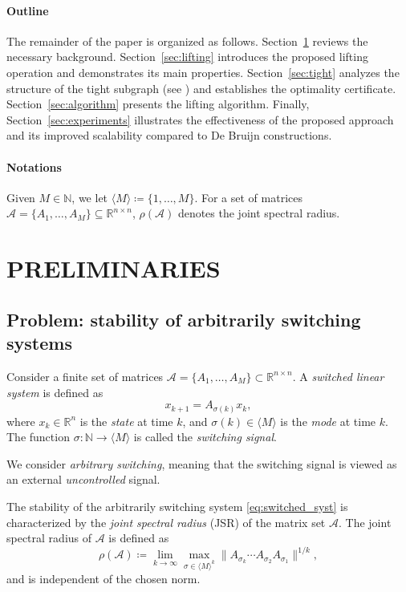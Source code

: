 \documentclass[letterpaper, 10 pt, conference]{ieeeconf}  %
\newcommand{\Mset}{\langle M\rangle}
\renewcommand{\Re}{\mathbb{R}}
\newif\ifextended
\begin{document}
\paragraph*{Outline}
The remainder of the paper is organized as follows.
Section~\ref{sec:preliminaries} reviews the necessary background.
Section~\ref{sec:lifting} introduces the proposed lifting operation and
demonstrates its main properties.
Section~\ref{sec:tight} analyzes the structure of the tight subgraph
(see ) and establishes the optimality
certificate.
Section~\ref{sec:algorithm} presents the lifting algorithm.
Finally, Section~\ref{sec:experiments} illustrates the effectiveness of
the proposed approach and its improved scalability compared to De Bruijn constructions.

\paragraph*{Notations}
Given $M\in \mathbb N$, we let $\Mset\coloneqq \{1,\dots,M\}$. 
For a set of matrices $\mathcal A=\{A_1,\dots,A_M\}\subseteq \Re^{n\times n}$, 
$\rho(\mathcal A)$ denotes the joint spectral radius\ifextended, while for a matrix 
$A \in \Re^{n\times n}$, $\rho(A)$ denotes the spectral radius.
\else.
\fi
\section{PRELIMINARIES}\label{sec:preliminaries}
\subsection{Problem: stability of arbitrarily switching systems}

Consider a finite set of matrices $\mathcal A = \{A_1,\dots,A_M\} \subset \mathbb{R}^{n\times n}$.
A \emph{switched linear system} is defined as
\begin{equation}
x_{k+1} = A_{\sigma(k)} x_k, \label{eq:switched_syst}
\end{equation}
where $x_k\in\mathbb{R}^n$ is the \emph{state} at time $k$, and
$\sigma(k)\in\Mset$ is the \emph{mode} at time $k$.
The function $\sigma : \mathbb{N} \to \Mset$ is called the
\emph{switching signal}.

We consider \emph{arbitrary switching}, meaning that the switching signal is viewed as an external \emph{uncontrolled} signal.

The stability of the arbitrarily switching system \eqref{eq:switched_syst}
is characterized by the \emph{joint spectral radius} (JSR) of the matrix
set $\mathcal A$. The joint spectral radius of $\mathcal A$ is defined as
\begin{equation}
\rho(\mathcal A) \coloneqq
\lim_{k\to\infty}
\max_{\sigma\in\Mset^k}
\|A_{\sigma_k} \cdots A_{\sigma_2} A_{\sigma_1}\|^{1/k},
\end{equation}
and is independent of the chosen norm.
\end{document}
